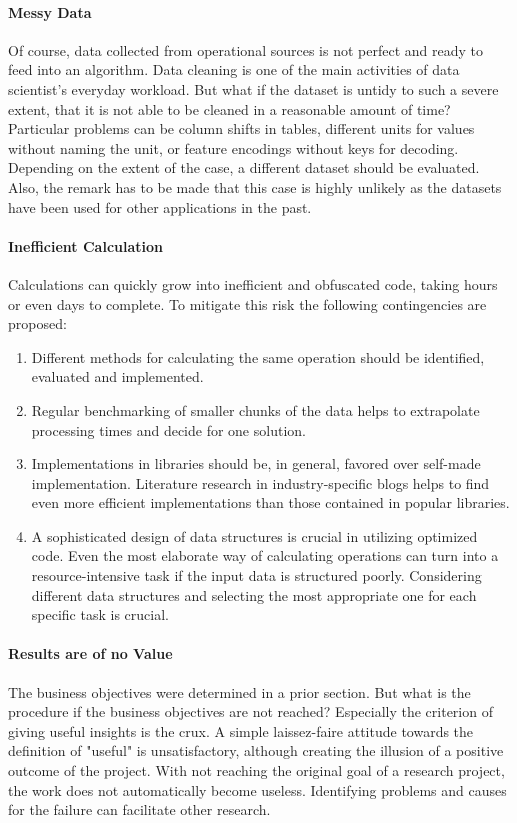 \paragraph{Messy Data} Of course, data collected from operational sources is not perfect and ready to feed into an algorithm. Data cleaning is one of the main activities of data scientist's everyday workload. But what if the dataset is untidy to such a severe extent, that it is not able to be cleaned in a reasonable amount of time?
Particular problems can be column shifts in tables, different units for values without naming the unit, or feature encodings without keys for decoding.
Depending on the extent of the case, a different dataset should be evaluated. Also, the remark has to be made that this case is highly unlikely as the datasets have been used for other applications in the past.

\paragraph{Inefficient Calculation} Calculations can quickly grow into inefficient and obfuscated code, taking hours or even days to complete. To mitigate this risk the following contingencies are proposed:

\begin{enumerate}
	\item Different methods for calculating the same operation should be identified, evaluated and implemented.
	\item Regular benchmarking of smaller chunks of the data helps to extrapolate processing times and decide for one solution.
	\item Implementations in libraries should be, in general, favored over self-made implementation. Literature research in industry-specific blogs helps to find even more efficient implementations than those contained in popular libraries.
	\item A sophisticated design of data structures is crucial in utilizing optimized code. Even the most elaborate way of calculating operations can turn into a resource-intensive task if the input data is structured poorly. Considering different data structures and selecting the most appropriate one for each specific task is crucial.
\end{enumerate}

\paragraph{Results are of no Value}
The business objectives were determined in a prior section. But what is the procedure if the business objectives are not reached? Especially the criterion of giving useful insights is the crux.
A simple laissez-faire attitude towards the definition of "useful" is unsatisfactory, although creating the illusion of a positive outcome of the project.
With not reaching the original goal of a research project, the work does not automatically become useless. Identifying problems and causes for the failure can facilitate other research.


